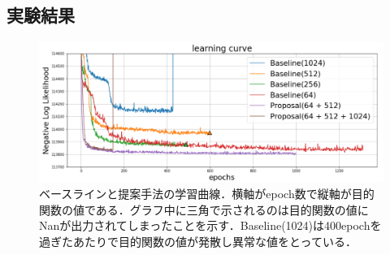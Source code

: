 \documentclass[10pt, twocolumn]{jarticle}
\begin{document}


\subsection{実験結果}


\begin{figure}[h]
    \begin{center}
        \includegraphics[width=\linewidth]{./figures/curve_yoko.png}
        \caption[提案手法の学習曲線]{\small ベースラインと提案手法の学習曲線．横軸がepoch数で縦軸が目的関数の値である．グラフ中に三角で示されるのは目的関数の値にNanが出力されてしまったことを示す．Baseline(1024)は400epochを過ぎたあたりで目的関数の値が発散し異常な値をとっている．}
        \label{fig:curve}
    \end{center}
    \end{figure}
\normalsize
\end{document}
